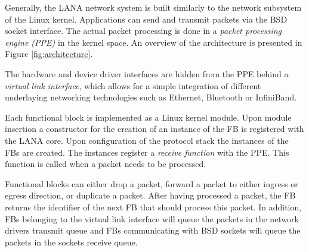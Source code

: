 \documentclass{sig-alternate}
\newcommand{\daniel}[1]{\textcolor{red}{\emph{DB: #1}}}
\begin{document}

Generally, the LANA network system is built similarly to the network subsystem of the Linux kernel.
Applications can send and transmit packets via the BSD socket interface. The actual packet processing is done in a \textit{packet processing engine (PPE)} in the kernel space. An overview of the architecture is presented in Figure \ref{fig:architecture}.


The hardware and device driver interfaces are hidden from the PPE behind a \textit{virtual link interface}, which allows for a simple integration of different underlaying networking technologies such as Ethernet, Bluetooth or InfiniBand.

Each functional block is implemented as a Linux kernel module. 
Upon module insertion a constructor for the creation of an instance of the FB is registered with the LANA core. Upon configuration of the protocol stack the instances of the FBs are created. The instances register a \textit{receive function} with the PPE. This function is called when a packet needs to be processed.

Functional blocks can either drop a packet, forward a packet to either ingress or egress direction, or duplicate a packet. After having processed a packet, the FB returns the identifier of the next FB that should process this packet. In addition, FBs belonging to the virtual link interface will queue the packets in the network drivers transmit queue and FBs communicating with BSD sockets will queue the packets in the sockets receive queue.
\end{document}
